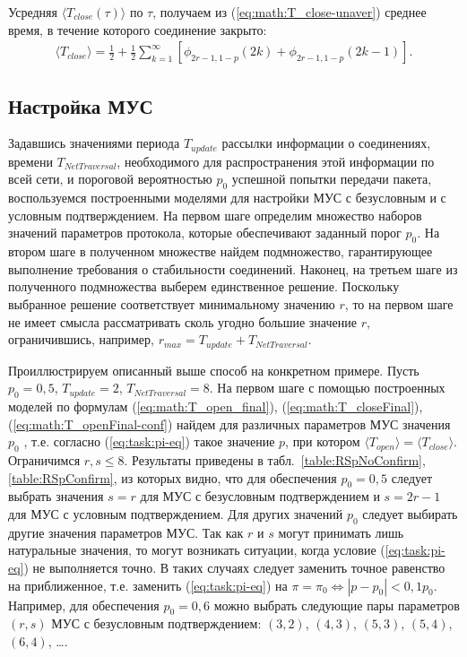 Усредняя $\langle T_{close} (\tau) \rangle$ по $\tau$, получаем из (\ref{eq:math:T_close-unaver}) среднее время, в течение которого соединение закрыто:
\begin{equation}
\label{eq:math:T_openFinal-conf}
\begin{array}{c}
\langle T_{close} \rangle= \frac{1}{2} + \frac{1}{2}  \sum \limits^{\infty}_{k=1} \left[ \phi_{2r-1,1-p}(2k)  + \phi_{2r-1,1-p}(2k-1) \right].
\end{array}
\end{equation}

% 

% 
\subsection{Настройка МУС}
\label{section:settings}
Задавшись значениями периода $T_{update}$ рассылки информации о соединениях, времени $T_{NetTraversal}$, необходимого для распространения этой информации по всей сети, и пороговой вероятностью $p_0$ успешной попытки передачи пакета, воспользуемся построенными моделями для настройки МУС с безусловным и с условным подтверждением. На первом шаге определим множество наборов значений параметров протокола, которые обеспечивают заданный порог $p_0$.  На втором шаге в полученном множестве найдем подмножество, гарантирующее выполнение требования  о стабильности соединений. Наконец, на третьем шаге из полученного подмножества выберем единственное решение. Поскольку выбранное решение соответствует минимальному значению $r$, то на первом шаге не имеет смысла рассматривать сколь угодно большие значение $r$, ограничившись, например, $r_{max}=T_{update}+T_{NetTraversal}$.

Проиллюстрируем описанный выше способ на конкретном примере. Пусть $p_0=0,5$, $T_{update} = 2$, $T_{NetTraversal}=8$. На первом шаге с помощью построенных моделей по формулам (\ref{eq:math:T_open_final}), (\ref{eq:math:T_closeFinal}), (\ref{eq:math:T_openFinal-conf}) найдем для различных параметров МУС значения $p_0$ , т.е. согласно (\ref{eq:task:pi-eq}) такое значение $p$, при котором $\langle T_{open}\rangle = \langle T_{close}\rangle$. Ограничимся $r,s \le 8$. Результаты приведены в табл.~\ref{table:RSpNoConfirm}, \ref{table:RSpConfirm}, из которых видно, что для обеспечения $p_0=0,5$ следует выбрать значения $s=r$ для МУС с безусловным подтверждением и $s=2r-1$ для МУС с условным подтверждением. Для других значений $p_0$ следует выбирать другие значения параметров МУС. Так как $r$ и $s$ могут принимать лишь натуральные значения, то могут возникать ситуации, когда условие (\ref{eq:task:pi-eq}) не выполняется точно. В таких случаях следует заменить точное равенство на приближенное, т.е. заменить  (\ref{eq:task:pi-eq}) на
$\pi = \pi_0 \Leftrightarrow  |p-p_0| < 0,1p_0$.
Например, для обеспечения $p_0=0,6$ можно выбрать следующие пары параметров $(r,s)$ МУС с безусловным подтверждением: $(3,2)$,  $(4,3)$, $(5,3)$, $(5,4)$, $(6,4)$, \ldots.

